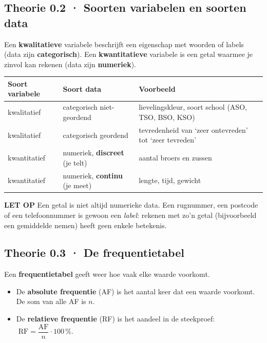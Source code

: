 \subsection*{Theorie 0.2 · Soorten variabelen en soorten data}

\begin{theorie}
Een \textbf{kwalitatieve} variabele beschrijft een eigenschap met woorden of labels (data zijn \textbf{categorisch}). Een \textbf{kwantitatieve} variabele is een getal waarmee je zinvol kan rekenen (data zijn \textbf{numeriek}).

\begin{tabular}{lll}
\hline
Soort variabele & Soort data & Voorbeeld \\
\hline
kwalitatief & categorisch niet-geordend & lievelingskleur, soort school (ASO, TSO, BSO, KSO) \\
kwalitatief & categorisch geordend & tevredenheid van ‘zeer ontevreden’ tot ‘zeer tevreden’ \\
kwantitatief & numeriek, \textbf{discreet} (je telt) & aantal broers en zussen \\
kwantitatief & numeriek, \textbf{continu} (je meet) & lengte, tijd, gewicht \\
\hline
\end{tabular}
\end{theorie}

\begin{letop}
\textbf{LET OP} \quad Een getal is niet altijd numerieke data. Een rugnummer, een postcode of een telefoonnummer is gewoon een \emph{label}: rekenen met zo’n getal (bijvoorbeeld een gemiddelde nemen) heeft geen enkele betekenis.
\end{letop}

\subsection*{Theorie 0.3 · De frequentietabel}

\begin{theorie}
Een \textbf{frequentietabel} geeft weer hoe vaak elke waarde voorkomt.

\begin{itemize}
\item De \textbf{absolute frequentie} (AF) is het aantal keer dat een waarde voorkomt. De som van alle AF is $n$.
\item De \textbf{relatieve frequentie} (RF) is het aandeel in de steekproef: $\;\text{RF}=\dfrac{\text{AF}}{n}\cdot 100\,\%$.
\end{itemize}
\end{theorie}

